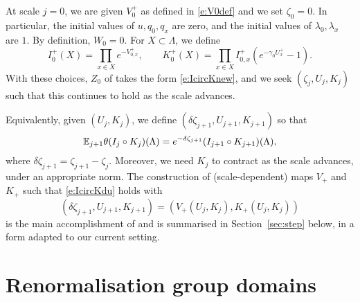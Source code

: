 At scale $j = 0$, we are given $V^+_0$ as defined in \eqref{e:V0def}
and we set $\zeta_0 = 0$. In particular,
the initial values of $u,q_0,q_x$ are zero, and the initial values of $\lambda_0,\lambda_x$
are $1$. By definition, $W_0 = 0$.
For $X \subset \Lambda$, we define
\begin{equation}
  \label{e:IK0def}
    I_0^+(X) = \prod_{x\in X} e^{-V^+_{0,x}},
    \quad\quad
    K_0^+(X) = \prod_{x \in X} I_{0,x}^+ (e^{-\gamma_0 U^{+}_{x}} - 1).
\end{equation}
With these choices, $Z_0$ of 
takes the form \eqref{e:IcircKnew}, and we seek $(\zeta_j, U_j, K_j)$ such that
this continues to hold as the scale advances.

Equivalently, given $(U_j, K_j)$, we define $(\delta\zeta_{j+1}, U_{j+1}, K_{j+1})$ so that
\begin{equation} \label{e:IcircKdu}
  \mathbb{E}_{j+1}\theta(I_j \circ K_j)(\Lambda)
  =
  e^{-\delta \zeta_{j+1}}(I_{j+1} \circ K_{j+1})(\Lambda),
\end{equation}
where $\delta\zeta_{j+1} = \zeta_{j+1} - \zeta_j$.
Moreover, we need $K_j$ to contract as the scale advances, under an appropriate norm.
The construction of (scale-dependent) maps $V_+$ and $K_+$ such that
\eqref{e:IcircKdu} holds with
\begin{equation}
    (\delta\zeta_{j+1}, U_{j+1}, K_{j+1}) = (V_+(U_j, K_j), K_+(U_j, K_j))
\end{equation}
is the main accomplishment of \cite{BS-rg-step} and is summarised in Section~\ref{sec:step}
below, in a form adapted to our current setting.


\section{Renormalisation group domains}

